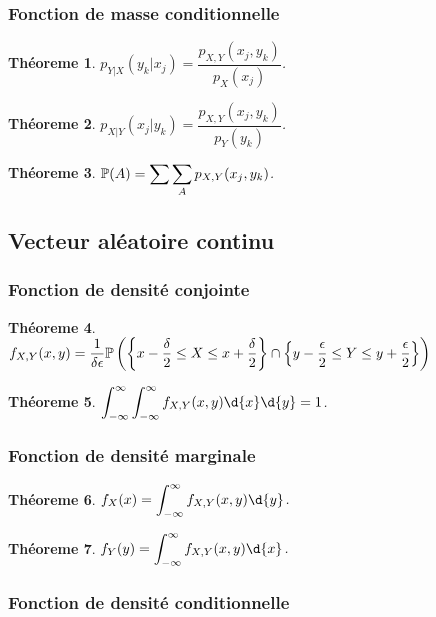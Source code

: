 \documentclass[11pt]{article}
\renewcommand\P{%
	\ensuremath{%
		\mathbb{P}%
	}%
}%
\newtheorem{theoreme}{Théoreme}[section]
\begin{document}
\subsubsection{Fonction de masse conditionnelle}
\begin{theoreme}
	$p_{Y|X}(y_k|x_j)=\dfrac{p_{X,Y}(x_j,y_k)}{p_X(x_j)}$.
\end{theoreme}

\begin{theoreme}
	$p_{X|Y}(x_j|y_k)=\dfrac{p_{X,Y}(x_j,y_k)}{p_Y(y_k)}$.
\end{theoreme}

\begin{theoreme}
	$\P(A)=\displaystyle\sum\displaystyle\sum_Ap_{X,Y}(x_j,y_k)$.
\end{theoreme}

\subsection{Vecteur aléatoire continu}
\subsubsection{Fonction de densité conjointe}
\begin{theoreme}
	$f_{X,Y}(x,y)=\dfrac{1}{\delta\epsilon}\P\left(
		\left\{
			x-\dfrac{\delta}{2}\leq X\leq x+\dfrac{\delta}{2}
		\right\}\cap
		\left\{
			y-\dfrac{\epsilon}{2}\leq Y\leq y+\dfrac{\epsilon}{2}
		\right\}
	\right)$
\end{theoreme}

\begin{theoreme}
	$\displaystyle\int_{-\infty}^\infty\displaystyle\int_{-\infty}^\infty
		f_{X,Y}(x,y)\d{x}\d{y}=1$.
\end{theoreme}

\subsubsection{Fonction de densité marginale}
\begin{theoreme}
	$f_X(x)=\displaystyle\int_{-\infty}^\infty f_{X,Y}(x,y)\d{y}$.
\end{theoreme}

\begin{theoreme}
	$f_Y(y)=\displaystyle\int_{-\infty}^\infty f_{X,Y}(x,y)\d{x}$.
\end{theoreme}

\subsubsection{Fonction de densité conditionnelle}
\end{document}
